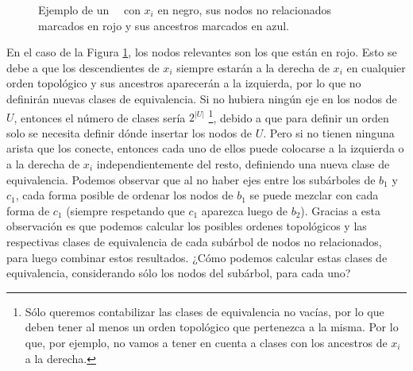 \begin{figure}[ht]
    \caption{Ejemplo de un \ \dtree \ con $x_i$ en negro, sus nodos no relacionados marcados en rojo y sus ancestros marcados en azul.}
    \label{fig:dtreeForestForEquivalenceClasses}
\end{figure}

En el caso de la Figura \ref{fig:dtreeForestForEquivalenceClasses}, los nodos relevantes son los que están en rojo. Esto se debe a que los descendientes de $x_i$ siempre estarán a la derecha de $x_i$ en cualquier orden topológico y sus ancestros aparecerán a la izquierda, por lo que no definirán nuevas clases de equivalencia. Si no hubiera ningún eje en los nodos de $U$, entonces el número de clases sería $2^{|U|}$ \footnote{Sólo queremos contabilizar las clases de equivalencia no vacías, por lo que deben tener al menos un orden topológico que pertenezca a la misma. Por lo que, por ejemplo, no vamos a tener en cuenta a clases con los ancestros de $x_i$ a la derecha.}, debido a que para definir un orden solo se necesita definir dónde insertar los nodos de $U$. Pero si no tienen ninguna arista que los conecte, entonces cada uno de ellos puede colocarse a la izquierda o a la derecha de $x_i$ independientemente del resto, definiendo una nueva clase de equivalencia. Podemos observar que al no haber ejes entre los subárboles de $b_1$ y $c_1$, cada forma posible de ordenar los nodos de $b_1$ se puede mezclar con cada forma de $c_1$ (siempre respetando que $c_1$ aparezca luego de $b_2$). Gracias a esta observación es que podemos calcular los posibles ordenes topológicos y las respectivas clases de equivalencia de cada subárbol de nodos no relacionados, para luego combinar estos resultados. ¿Cómo podemos calcular estas clases de equivalencia, considerando sólo los nodos del subárbol, para cada uno?

